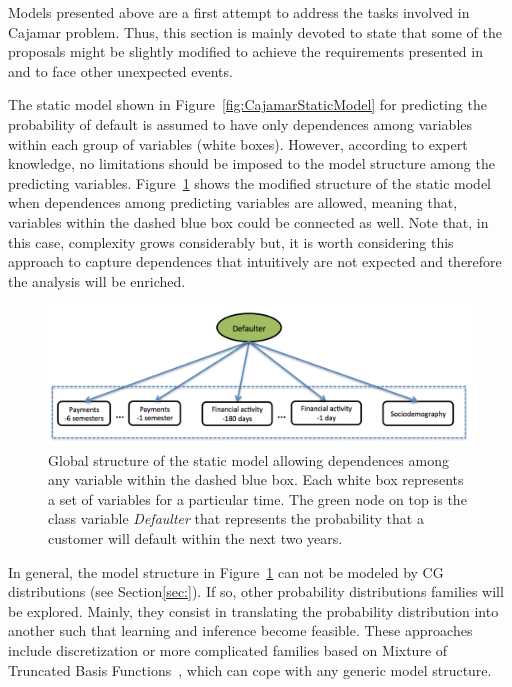 Models presented above are a first attempt to address the tasks involved in Cajamar problem. Thus, this section is mainly devoted to state that some of the proposals might be slightly modified to achieve the requirements presented in~\cite{Fer14b} and to face other unexpected events.

The static model shown in Figure~\ref{fig:CajamarStaticModel} for predicting the probability of default is assumed to have only dependences among variables within each group of variables (white boxes). However, according to expert knowledge, no limitations should be imposed to the model structure among the predicting variables. Figure~\ref{fig:staticDependences} shows the modified structure of the static model when dependences among predicting variables are allowed, meaning that, variables within the dashed blue box could be connected as well. Note that, in this case, complexity grows considerably but, it is worth considering this approach to capture dependences that intuitively are not expected and therefore the analysis will be enriched.

\begin{figure}[htbp]
  \centering
\includegraphics[scale=0.35]{./figures/CajaMarModel3}
\caption{\label{fig:staticDependences}Global structure of the static model allowing dependences among any variable within the dashed blue box. Each white box represents a set of variables for a particular time. The green node on top is the class variable \emph{Defaulter} that represents the probability that a customer will default within the next two years.} 
\end{figure}


In general, the model structure in Figure~\ref{fig:staticDependences} can not be modeled by CG distributions (see Section\ref{sec:}). If so, other probability distributions families will be explored. Mainly, they consist in translating the probability distribution into another such that learning and inference become feasible. These approaches include discretization or more complicated families based on Mixture of Truncated Basis Functions~\cite{Lan12}, which can cope with any generic model structure.


